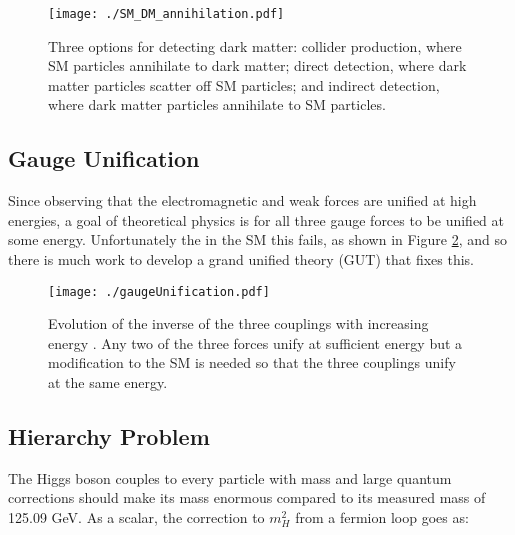 \begin{figure}[h!]
  \centering
	\texttt{[image: ./SM\_DM\_annihilation.pdf]}
\caption{\label{fig:dmMake}{ Three options for detecting dark matter: collider production, where SM particles annihilate to dark matter; direct detection, where dark matter particles scatter off SM particles; and indirect detection, where dark matter particles annihilate to SM particles.  }} 
\end{figure}

\subsection{Gauge Unification}
\label{gaugeUni}

Since observing that the electromagnetic and weak forces are unified at high energies, a goal of theoretical physics is for all three gauge forces to be unified at some energy.  Unfortunately the in the SM this fails, as shown in Figure \ref{fig:gaugeUni}, and so there is much work to develop a grand unified theory (GUT) that fixes this.  \\

\begin{figure}[h!]
  \centering
	\texttt{[image: ./gaugeUnification.pdf]}
\caption{\label{fig:gaugeUni}{ Evolution of the inverse of the three couplings with increasing energy \cite{Kazakov}.  Any two of the three forces unify at sufficient energy but a modification to the SM is needed so that the three couplings unify at the same energy.  }} 
\end{figure}


\subsection{Hierarchy Problem}
\label{sec:HierarchyProblem}

The Higgs boson couples to every particle with mass and large quantum corrections should make its mass enormous compared to its measured mass of 125.09 GeV.  As a scalar, the correction to $m_{H}^2$ from a fermion loop goes as: %

